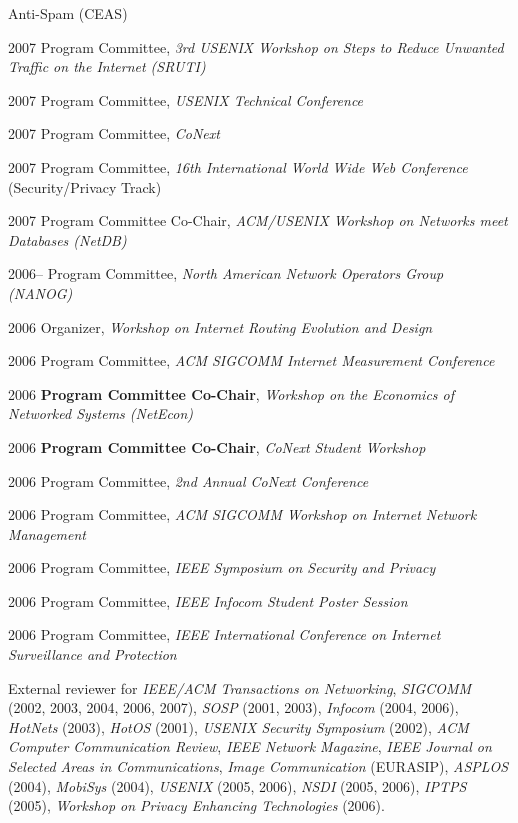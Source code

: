\begin{cvlist}{}
{  Anti-Spam (CEAS)}
\item[2007] Program Committee, {\em 3rd USENIX Workshop on Steps to
  Reduce Unwanted Traffic on the Internet (SRUTI)}
\item[2007] Program Committee, {\em USENIX Technical Conference} 
\item[2007] Program Committee, {\em CoNext}
\item[2007] Program Committee, {\em 16th International World Wide Web
  Conference} (Security/Privacy Track)
\item[2007] Program Committee Co-Chair, {\em ACM/USENIX Workshop on
  Networks meet Databases (NetDB)}
\item[2006--] Program Committee, {\em North American Network Operators
  Group (NANOG)} 
\item[2006] Organizer, {\em Workshop on Internet Routing Evolution and Design} 
\item[2006] Program Committee, {\em ACM SIGCOMM Internet Measurement
  Conference} 
\item[2006] {\bf Program Committee Co-Chair}, {\em Workshop on the Economics
  of Networked Systems (NetEcon)}
\item[2006] {\bf Program Committee Co-Chair}, {\em CoNext Student Workshop}
\item[2006] Program Committee, {\em 2nd Annual CoNext Conference}
\item[2006] Program Committee, {\em ACM SIGCOMM Workshop on Internet
  Network Management}
\item[2006] Program Committee, {\em IEEE Symposium on Security and Privacy}
\item[2006] Program Committee, {\em IEEE Infocom Student Poster Session}
\item[2006] Program Committee, {\em IEEE International Conference on
  Internet Surveillance and Protection} 
\end{cvlist}

\noindent
External reviewer for {\em IEEE/ACM Transactions on Networking}, {\em
SIGCOMM} (2002, 2003, 2004, 2006, 2007), {\em SOSP} (2001, 2003), {\em
Infocom} (2004, 2006), {\em HotNets} (2003), {\em HotOS} (2001), {\em
USENIX Security Symposium} (2002), {\em ACM Computer Communication
Review}, {\em IEEE Network Magazine}, {\em IEEE Journal on Selected
Areas in Communications}, {\em Image Communication} (EURASIP), {\em
ASPLOS} (2004), {\em MobiSys} (2004), {\em USENIX} (2005, 2006), {\em
NSDI} (2005, 2006), {\em IPTPS} (2005), {\em Workshop on Privacy
  Enhancing Technologies} (2006).  \\


